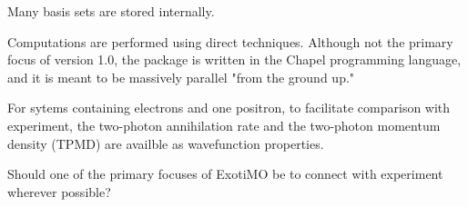 Many basis sets are stored internally.

Computations are performed using direct techniques. Although not the primary focus of version 1.0, 
the package is written in the Chapel programming language, and it is meant to be massively parallel 
"from the ground up." 

For sytems containing electrons and one positron, to facilitate comparison with experiment, the 
two-photon annihilation rate and the 
two-photon momentum density (TPMD) are availble as wavefunction properties.

\begin{openissue}
Should one of the primary focuses of ExotiMO be to connect with experiment wherever possible?
\end{openissue}

